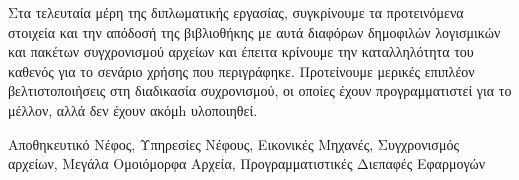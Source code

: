 \begin{abstractgr}
  Στα τελευταία μέρη της διπλωματικής εργασίας, συγκρίνουμε τα προτεινόμενα στοιχεία και την απόδοσή της βιβλιοθήκης με αυτά διαφόρων δημοφιλών λογισμικών και πακέτων συγχρονισμού αρχείων και έπειτα κρίνουμε την καταλληλότητα του καθενός για το σενάριο χρήσης που περιγράφηκε. Προτείνουμε μερικές επιπλέον βελτιστοποιήσεις στη διαδικασία συχρονισμού, οι οποίες έχουν προγραμματιστεί για το μέλλον, αλλά δεν έχουν ακόμh υλοποιηθεί.

\begin{keywordsgr}
    Αποθηκευτικό Νέφος, Υπηρεσίες Νέφους, Εικονικές Μηχανές, Συγχρονισμός αρχείων, Μεγάλα Ομοιόμορφα Αρχεία, Προγραμματιστικές Διεπαφές Εφαρμογών
\end{keywordsgr}
\end{abstractgr}

\onehalfspacing
